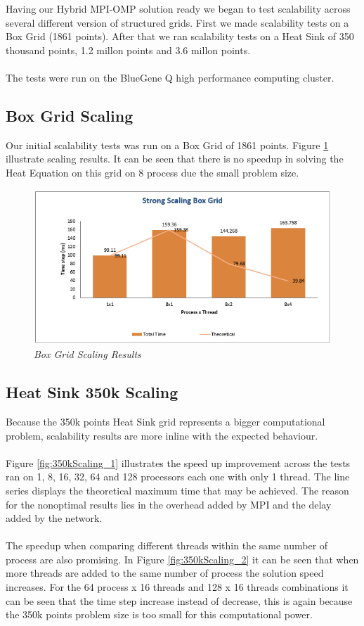 \documentclass[12pt]{article}
\begin{document}
Having our Hybrid MPI-OMP solution ready we began to test scalability across several different version of structured grids. First we made scalability tests on a Box Grid (1861 points). After that we ran scalability tests on a Heat Sink of 350 thousand points, 1.2 millon points and 3.6 millon points.
\\\\
The tests were run on the BlueGene Q high performance computing cluster.

\subsection{Box Grid Scaling}
Our initial scalability tests was run on a Box Grid of 1861 points. Figure \ref{fig:boxGridScaling} illustrate scaling results. It can be seen that there is no speedup in solving the Heat Equation on this grid on 8 process due the small problem size.

\begin{figure}[h!]
    \includegraphics[scale=0.9]{scalingBoxGrid.png}
    \centering
    \caption{\textit{Box Grid Scaling Results}}
    \label{fig:boxGridScaling}
\end{figure}

\subsection{Heat Sink 350k Scaling}
Because the 350k points Heat Sink grid represents a bigger computational problem, scalability results are more inline with the expected behaviour.
\\\\
Figure \ref{fig:350kScaling_1} illustrates the speed up improvement across the tests ran on 1, 8, 16, 32, 64 and 128 processors each one with only 1 thread. The line series displays the theoretical maximum time that may be achieved. The reason for the nonoptimal results lies in the overhead added by MPI and the delay added by the network.
\\\\
The speedup when comparing different threads within the same number of process are also promising. In Figure \ref{fig:350kScaling_2} it can be seen that when more threads are added to the same number of process the solution speed increases. For the 64 process x 16 threads and 128 x 16 threads combinations it can be seen that the time step increase instead of decrease, this is again because the 350k points problem size is too small for this computational power.
\end{document}
